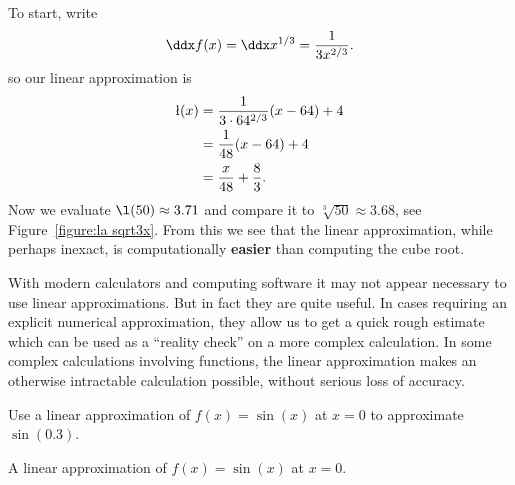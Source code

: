 \begin{solution}
To start, write
\[
\ddx f(x) = \ddx x^{1/3} = \frac{1}{3x^{2/3}}.
\]
so our linear approximation is
\begin{align*}
\l(x) &= \frac{1}{3\cdot 64^{2/3}} (x-64) + 4 \\
&= \frac{1}{48} (x-64) + 4\\
&= \frac{x}{48} +\frac{8}{3}.
\end{align*}
Now we evaluate $\l(50) \approx 3.71$ and compare it to
$\sqrt[3]{50}\approx 3.68$, see Figure~\ref{figure:la sqrt3x}. From
this we see that the linear approximation, while perhaps inexact, is
computationally \textbf{easier} than computing the cube root.
\end{solution}

With modern calculators and computing software it may not appear
necessary to use linear approximations. But in fact they are quite
useful. In cases requiring an explicit numerical approximation, they
allow us to get a quick rough estimate which can be used as a
``reality check'' on a more complex calculation. In some complex
calculations involving functions, the linear approximation makes an
otherwise intractable calculation possible, without serious loss of
accuracy.




\begin{example}%
Use a linear approximation of $f(x) =\sin(x)$ at $x=0$ to approximate
$\sin(0.3)$.
\end{example}

\begin{marginfigure}
\caption{A linear approximation of $f(x) = \sin(x)$ at $x=0$.}
\label{figure:la sin}
\end{marginfigure}

